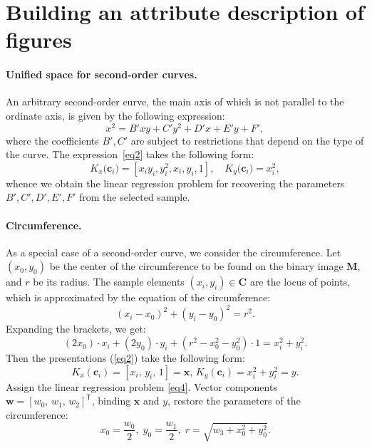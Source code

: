 \section{Building an attribute description of figures}
\label{sec:3}
\paragraph{ Unified space for second-order curves.} An arbitrary second-order curve, the main axis of which is not parallel to the ordinate axis, is given by the following expression:
\[
\label{st:coef}
x^2 = B'xy+C'y^2+D'x+E'y+F',
\]
where the coefficients $B ', C'$ are subject to restrictions that depend on the type of the curve. The expression~\eqref{eq2} takes the following form:
\[
\label{st:K_map}
K_x\bigr(\mathbf{c}_i\bigr)=\left[x_iy_i, y_i^2, x_i, y_i, 1\right], \quad K_y\bigr(\mathbf{c}_i\bigr)=x_i^2,
\]
whence we obtain the linear regression problem for recovering the parameters~$ B ', C', D ', E', F '$ from the selected sample.

\paragraph{ Circumference.} As a special case of a second-order curve, we consider the circumference.
Let $(x_0, y_0)$ be the center of the circumference to be found on the binary image $\mathbf {M} $, and $r$ be its radius.
The sample elements $(x_i, y_i) \in \mathbf {C}$ are the locus of points, which is approximated by the equation of the circumference:
\begin{equation}
(x_i - x_0)^2 + (y_i - y_0)^2 = r^2.
\end{equation}
Expanding the brackets, we get:
\begin{equation}(2x_0)\cdot x_i + (2y_0)\cdot y_i + (r^2 - x_0^2 - y_0^2)\cdot 1 = x_i^2 + y_i^2 . 
\end{equation}
Then the presentations (\ref{eq2}) take the following form:
\begin{equation}
\label{10}
K_{x}(\mathbf{c}_i) = [x_i, \, y_i, \, 1] = \mathbf{x}, \,  K_{y}(\mathbf{c}_i) = x_i^2+y_i^2 = y.
\end{equation} 
Assign the linear regression problem \eqref{eq4}.
Vector components $\mathbf{w} = [w_0, \, w_1, \, w_2]^\mathsf{T}$, binding $\mathbf{x}$ and $y$, restore the parameters of the circumference: \begin{equation} x_0 = \frac{w_0}{2}, \; y_0 = \frac{w_1}{2}, \; r = \sqrt{w_3 + x_0^2 + y_0 ^2}.\end{equation}

